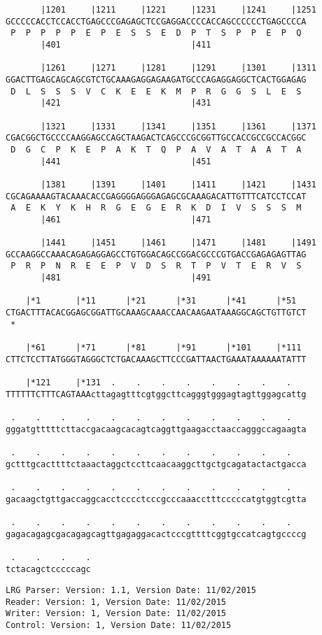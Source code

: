 \documentclass{article}
\begin{document}
\begin{Verbatim}
       |1201     |1211     |1221     |1231     |1241     |1251
GCCCCCACCTCCACCTGAGCCCGAGAGCTCCGAGGACCCCACCAGCCCCCCTGAGCCCCA
 P  P  P  P  P  E  P  E  S  S  E  D  P  T  S  P  P  E  P  Q 
       |401                          |411                   
  
       |1261     |1271     |1281     |1291     |1301     |1311
GGACTTGAGCAGCAGCGTCTGCAAAGAGGAGAAGATGCCCAGAGGAGGCTCACTGGAGAG
 D  L  S  S  S  V  C  K  E  E  K  M  P  R  G  G  S  L  E  S 
       |421                          |431                   
  
       |1321     |1331     |1341     |1351     |1361     |1371
CGACGGCTGCCCCAAGGAGCCAGCTAAGACTCAGCCCGCGGTTGCCACCGCCGCCACGGC
 D  G  C  P  K  E  P  A  K  T  Q  P  A  V  A  T  A  A  T  A 
       |441                          |451                   
  
       |1381     |1391     |1401     |1411     |1421     |1431
CGCAGAAAAGTACAAACACCGAGGGGAGGGAGAGCGCAAAGACATTGTTTCATCCTCCAT
 A  E  K  Y  K  H  R  G  E  G  E  R  K  D  I  V  S  S  S  M 
       |461                          |471                   
  
       |1441     |1451     |1461     |1471     |1481     |1491
GCCAAGGCCAAACAGAGAGGAGCCTGTGGACAGCCGGACGCCCGTGACCGAGAGAGTTAG
 P  R  P  N  R  E  E  P  V  D  S  R  T  P  V  T  E  R  V  S 
       |481                          |491                   
  
    |*1       |*11      |*21      |*31      |*41      |*51  
CTGACTTTACACGGAGCGGATTGCAAAGCAAACCAACAAGAATAAAGGCAGCTGTTGTCT
 *   
  
    |*61      |*71      |*81      |*91      |*101     |*111 
CTTCTCCTTATGGGTAGGGCTCTGACAAAGCTTCCCGATTAACTGAAATAAAAAATATTT
  
    |*121     |*131  .    .    .    .    .    .    .    .   
TTTTTTCTTTCAGTAAActtagagtttcgtggcttcagggtgggagtagttggagcattg
  
 .    .    .    .    .    .    .    .    .    .    .    .   
gggatgtttttcttaccgacaagcacagtcaggttgaagacctaaccagggccagaagta
  
 .    .    .    .    .    .    .    .    .    .    .    .   
gctttgcacttttctaaactaggctccttcaacaaggcttgctgcagatactactgacca
  
 .    .    .    .    .    .    .    .    .    .    .    .   
gacaagctgttgaccaggcacctcccctcccgcccaaacctttcccccatgtggtcgtta
  
 .    .    .    .    .    .    .    .    .    .    .    .   
gagacagagcgacagagcagttgagaggacactcccgttttcggtgccatcagtgccccg
  
 .    .    .    .
tctacagctcccccagc
\end{Verbatim}
\newpage
\begin{Verbatim}
LRG Parser: Version: 1.1, Version Date: 11/02/2015
Reader: Version: 1, Version Date: 11/02/2015
Writer: Version: 1, Version Date: 11/02/2015
Control: Version: 1, Version Date: 11/02/2015
\end{Verbatim}
\end{document}
